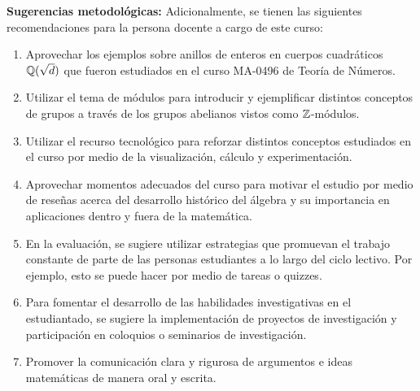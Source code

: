 \begin{refsection}
\textbf{Sugerencias metodológicas:} Adicionalmente, se tienen las siguientes recomendaciones para la persona docente a cargo de este curso:
\begin{enumerate}
    \item Aprovechar los ejemplos sobre anillos de enteros en cuerpos cuadráticos $\mathbb{Q}(\sqrt{d})$ que fueron estudiados en el curso MA-0496 de Teoría de Números.
    \item Utilizar el tema de módulos para introducir y ejemplificar distintos conceptos de grupos a través de los grupos abelianos vistos como $\mathbb{Z}$-módulos.
    \item Utilizar el recurso tecnológico para reforzar distintos conceptos estudiados en el curso por medio de la visualización, cálculo y experimentación.
    \item Aprovechar momentos adecuados del curso para motivar el estudio por medio de reseñas acerca del desarrollo histórico del álgebra y su importancia en aplicaciones dentro y fuera de la matemática.
    \item En la evaluación, se sugiere utilizar estrategias que promuevan el trabajo constante de parte de las personas estudiantes a lo largo del ciclo lectivo. Por ejemplo, esto se puede hacer por medio de tareas o quizzes.
    \item Para fomentar el desarrollo de las habilidades investigativas en el estudiantado, se sugiere la implementación de proyectos de investigación y participación en coloquios o seminarios de investigación.
    \item Promover la comunicación clara y rigurosa de argumentos e ideas matemáticas de manera oral y escrita.
\end{enumerate}




\end{refsection}
